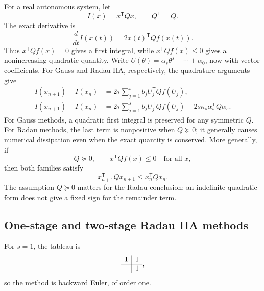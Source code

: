 For a real autonomous system, let
\[
 I(x)=x^{\mathsf T}Qx,\qquad Q^{\mathsf T}=Q.
\]
The exact derivative is
\[
 \frac{d}{dt}I(x(t))=2x(t)^{\mathsf T}Qf(x(t)).
\]
Thus \(x^{\mathsf T}Qf(x)=0\) gives a first integral, while
\(x^{\mathsf T}Qf(x)\leq0\) gives a nonincreasing quadratic
quantity. Write
\(U(\theta)=\alpha_s\theta^s+\cdots+\alpha_0\), now with
vector coefficients. For Gauss and Radau IIA, respectively, the
quadrature arguments give
\begin{align}
 I(x_{n+1})-I(x_n)
  &=2\tau\sum_{j=1}^s b_jU_j^{\mathsf T}Qf(U_j),
       \label{eq:gauss-quadratic-sep-25}\\
 I(x_{n+1})-I(x_n)
  &=2\tau\sum_{j=1}^s b_jU_j^{\mathsf T}Qf(U_j)
     -2s\kappa_s\alpha_s^{\mathsf T}Q\alpha_s.
       \label{eq:radau-quadratic-sep-25}
\end{align}
For Gauss methods, a quadratic first integral is preserved for any
symmetric \(Q\). For Radau methods, the last term is nonpositive
when \(Q\succeq0\); it generally causes numerical dissipation even
when the exact quantity is conserved. More generally, if
\[
 Q\succeq0,\qquad x^{\mathsf T}Qf(x)\leq0\quad\text{for all }x,
\]
then both families satisfy
\[
 x_{n+1}^{\mathsf T}Qx_{n+1}\leq x_n^{\mathsf T}Qx_n.
\]
The assumption \(Q\succeq0\) matters for the Radau conclusion:
an indefinite quadratic form does not give a fixed sign for the
remainder term.

\subsection{One-stage and two-stage Radau IIA methods}

For \(s=1\), the tableau is
\[
 \begin{array}{c|c}1&1\\ \hline &1\end{array},
\]
so the method is backward Euler, of order one.

